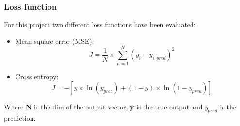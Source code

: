 \documentclass{article}
\begin{document}
\subsubsection{Loss function}
For this project two different loss functions have been evaluated: 
\begin{itemize}
    \item Mean square error (MSE):
    \begin{equation}\nonumber
        J = \frac{1}{N} \times \sum_{n=1}^{N} (y_i - y_{i,pred})^2
    \end{equation}
    
    \item Cross entropy:
    \begin{equation}\nonumber
        J = -[y \times \ln(y_{pred}) + (1 - y) \times \ln(1 - y_{pred})]
    \end{equation}
\end{itemize}

Where \textbf{N} is the dim of the output vector, \textbf{y} is the true output and \textbf{$y_{pred}$} is  the  prediction.
\end{document}
